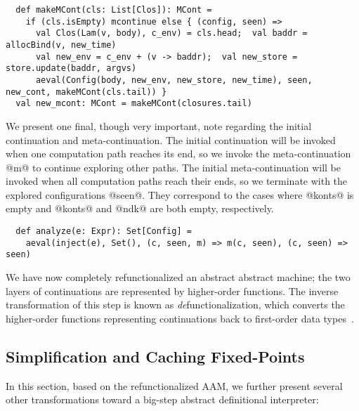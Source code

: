 \documentclass[acmsmall, screen]{acmart}\settopmatter{}
\begin{document}
\begin{lstlisting}
  def makeMCont(cls: List[Clos]): MCont =
    if (cls.isEmpty) mcontinue else { (config, seen) =>
      val Clos(Lam(v, body), c_env) = cls.head;  val baddr = allocBind(v, new_time)
      val new_env = c_env + (v -> baddr);  val new_store = store.update(baddr, argvs)
      aeval(Config(body, new_env, new_store, new_time), seen, new_cont, makeMCont(cls.tail)) }
  val new_mcont: MCont = makeMCont(closures.tail)
\end{lstlisting}

We present one final, though very important, note regarding the initial continuation and meta-continuation.
The initial continuation will be invoked when one computation path reaches its end,
so we invoke the meta-continuation @m@ to continue exploring other paths.
The initial meta-continuation will be invoked when all computation paths reach their ends,
so we terminate with the explored configurations @seen@. They correspond to the
cases where @konts@ is empty and @konts@ and @ndk@ are both empty, respectively.

\begin{lstlisting}
  def analyze(e: Expr): Set[Config] =
    aeval(inject(e), Set(), (c, seen, m) => m(c, seen), (c, seen) => seen)
\end{lstlisting}

We have now completely refunctionalized an abstract abstract machine; the two layers
of continuations are represented by higher-order functions. The inverse transformation
of this step is known as \textit{de}functionalization, which converts the higher-order functions
representing continuations back to first-order data
types~\cite{Danvy:2001:DW:773184.773202, Danvy:2008:DIP:1411204.1411206}.

\subsection{Simplification and Caching Fixed-Points}

In this section, based on the refunctionalized AAM, we
further present several other transformations toward a big-step abstract
definitional interpreter:
\end{document}
